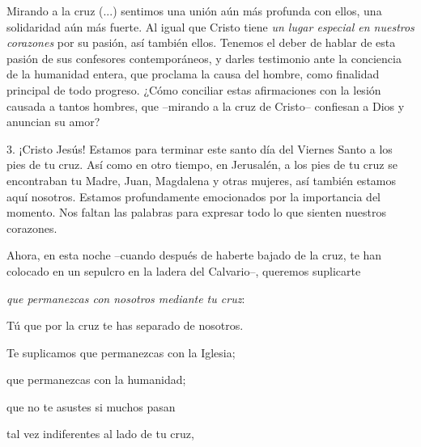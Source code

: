			\begin{body}Mirando a la cruz (...) sentimos una unión aún más profunda con ellos, una solidaridad aún más fuerte. Al igual que Cristo tiene \textit{un lugar especial en nuestros corazones} por su pasión, así también ellos. Tenemos el deber de hablar de esta pasión de sus confesores contemporáneos, y darles testimonio ante la conciencia de la humanidad entera, que proclama la causa del hombre, como finalidad principal de todo progreso. ¿Cómo conciliar estas afirmaciones con la lesión causada a tantos hombres, que –mirando a la cruz de Cristo– confiesan a Dios y anuncian su amor?\end{body}
			
			\begin{body}3. ¡Cristo Jesús! Estamos para terminar este santo día del Viernes Santo a los pies de tu cruz. Así como en otro tiempo, en Jerusalén, a los pies de tu cruz se encontraban tu Madre, Juan, Magdalena y otras mujeres, así también estamos aquí nosotros. Estamos profundamente emocionados por la importancia del momento. Nos faltan las palabras para expresar todo lo que sienten nuestros corazones. \end{body}
			
			\begin{body}Ahora, en esta noche –cuando después de haberte bajado de la cruz, te han colocado en un sepulcro en la ladera del Calvario–, queremos suplicarte \end{body}
			
			\begin{bodyprose}\textit{que permanezcas con nosotros mediante tu cruz}: \end{bodyprose}
			
			\begin{bodyprose}Tú que por la cruz te has separado de nosotros. \end{bodyprose}
			
			\begin{bodyprose}Te suplicamos que permanezcas con la Iglesia; \end{bodyprose}
			
			\begin{bodyprose}que permanezcas con la humanidad; \end{bodyprose}
			
			\begin{bodyprose}que no te asustes si muchos pasan \end{bodyprose}
			
			\begin{bodyprose}tal vez indiferentes al lado de tu cruz, \end{bodyprose}
			
